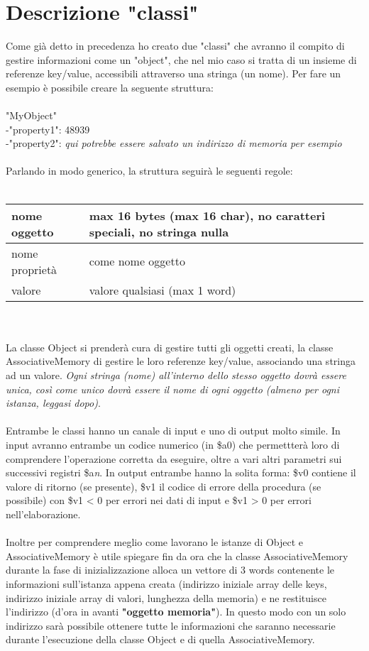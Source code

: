 \documentclass[a4paper]{article}
\newcommand\tab[1][0.5cm]{\hspace*{#1}}
\begin{document}
\section{Descrizione "classi"}
Come già detto in precedenza ho creato due "classi" che avranno il compito di gestire informazioni come un "object", che nel mio caso si tratta di un insieme di referenze key/value, accessibili attraverso una stringa (un nome). Per fare un esempio è possibile creare la seguente struttura:
\\
\\
"MyObject"\\
\tab-\tab"property1": 48939\\
\tab-\tab"property2": \textit{qui potrebbe essere salvato un indirizzo di memoria per esempio}\\
\\
Parlando in modo generico, la struttura seguirà le seguenti regole:\\
\\
\begin{tabular}{ |l|l| }
  \hline
  nome oggetto & max 16 bytes (max 16 char), no caratteri speciali, no stringa nulla \\ \hline
  nome proprietà & come nome oggetto \\ \hline
  valore & valore qualsiasi (max 1 word) \\ \hline
\end{tabular}
\\\\
La classe Object si prenderà cura di gestire tutti gli oggetti creati, la classe AssociativeMemory di gestire le loro referenze key/value, associando una stringa ad un valore. \textit{Ogni stringa (nome) all'interno dello stesso oggetto dovrà essere unica, così come unico dovrà essere il nome di ogni oggetto (almeno per ogni istanza, leggasi dopo)}.
\\\\
Entrambe le classi hanno un canale di input e uno di output molto simile. In input avranno entrambe un codice numerico (in \$a0) che permettterà loro di comprendere l'operazione corretta da eseguire, oltre a vari altri parametri sui successivi registri \$a\textit{n}. In output entrambe hanno la solita forma: \$v0 contiene il valore di ritorno (se presente), \$v1 il codice di errore della procedura (se possibile) con \$v1 < 0 per errori nei dati di input e \$v1 > 0 per errori nell'elaborazione.
\\\\
Inoltre per comprendere meglio come lavorano le istanze di Object e AssociativeMemory è utile spiegare fin da ora che la classe AssociativeMemory durante la fase di inizializzazione alloca un vettore di 3 words contenente le informazioni sull'istanza appena creata (indirizzo iniziale array delle keys, indirizzo iniziale array di valori, lunghezza della memoria) e ne restituisce l'indirizzo (d'ora in avanti \textbf{"oggetto memoria"}). In questo modo con un solo indirizzo sarà possibile ottenere tutte le informazioni che saranno necessarie durante l'esecuzione della classe Object e di quella AssociativeMemory.
\end{document}
